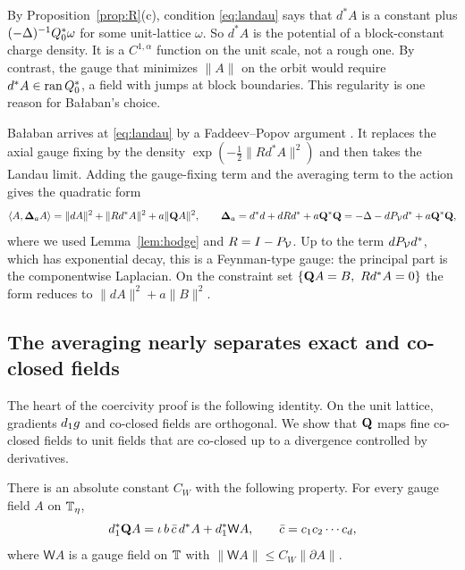 By Proposition~\ref{prop:R}(c), condition \eqref{eq:landau} says that $d^*A$ is a constant plus $(-\Delta)^{-1}Q_0^*\omega$ for some unit-lattice $\omega$. So $d^*A$ is the potential of a block-constant charge density. It is a $C^{1,\alpha}$ function on the unit scale, not a rough one. By contrast, the gauge that minimizes $\|A\|$ on the orbit would require $d^*A\in\operatorname{ran} Q_0^*$, a field with jumps at block boundaries. This regularity is one reason for Ba\l aban's choice.

\begin{remark}\label{x:9.2}
Ba\l aban arrives at \eqref{eq:landau} by a Faddeev--Popov argument \cite[(1.21)--(1.39)]{BalPropI}. It replaces the axial gauge fixing by the density $\exp(-\frac12\|Rd^*A\|^2)$ and then takes the Landau limit. Adding the gauge-fixing term and the averaging term to the action gives the quadratic form
\[
\langle A,\boldsymbol{\Delta}_aA\rangle=\|dA\|^2+\|Rd^*A\|^2+a\|\mathbf Q A\|^2,\qquad
\boldsymbol{\Delta}_a=d^*d+dRd^*+a\mathbf Q^*\mathbf Q=-\Delta-dP_\mathcal V d^*+a\mathbf Q^*\mathbf Q ,
\]
where we used Lemma~\ref{lem:hodge} and $R=I-P_\mathcal V$. Up to the term $dP_\mathcal V d^*$, which has exponential decay, this is a Feynman-type gauge: the principal part is the componentwise Laplacian. On the constraint set $\{\bQ A=B,\ Rd^*A=0\}$ the form reduces to $\|dA\|^2+a\|B\|^2$.
\end{remark}

\subsection{The averaging nearly separates exact and co-closed fields}\label{ss:9.3}

The heart of the coercivity proof is the following identity. On the unit lattice, gradients $d_1 g$ and co-closed fields are orthogonal. We show that $\mathbf Q$ maps fine co-closed fields to unit fields that are co-closed up to a divergence controlled by derivatives.

\begin{lemma}\label{lem:Q-divergence}
There is an absolute constant $C_W$ with the following property. For every gauge field $A$ on $\mathbb T_\eta$,
\[
d_1^*\mathbf Q A=\iota\,b\,\bar c\,d^*A+d_1^*\mathsf WA,\qquad \bar c=c_1c_2\cdots c_d,
\]
where $\mathsf WA$ is a gauge field on $\mathbb T$ with $\|\mathsf WA\|\le C_W\|\partial A\|$.
\end{lemma}

